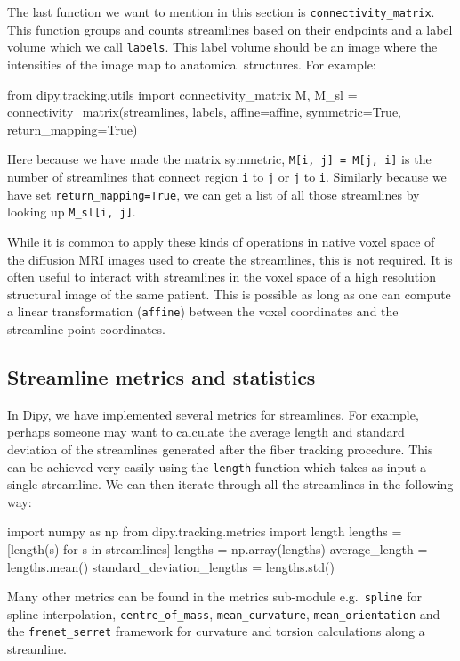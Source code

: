 \documentclass{bioinfo}
\begin{document}
The last function we want to mention in this section is
\texttt{connectivity\_matrix}. This function groups and counts streamlines
based on their endpoints and a label volume which we call \texttt{labels}. This
label volume should be an image where the intensities of the image map to
anatomical structures. For example:

\begin{python}
from dipy.tracking.utils import
                              connectivity_matrix
M, M_sl = connectivity_matrix(streamlines, labels,
                              affine=affine,
                              symmetric=True,
                              return_mapping=True)
\end{python}

Here because we have made the matrix symmetric, \texttt{M[i, j] = M[j, i]} is the number of streamlines that connect region \texttt{i} to \texttt{j}
or \texttt{j} to \texttt{i}. Similarly because we have set
\texttt{return\_mapping=True}, we can get a list of all those streamlines by
looking up \texttt{M\_sl[i, j]}.

While it is common to apply these kinds of operations in native voxel space of
the diffusion MRI images used to create the streamlines, this is not
required. It is often useful to interact with streamlines in the voxel space of
a high resolution structural image of the same patient. This is possible as
long as one can compute a linear transformation (\texttt{affine}) between the voxel coordinates and the streamline point coordinates.

\subsection{Streamline metrics and statistics}

In Dipy, we have implemented several metrics for streamlines. For example,
perhaps someone may want to calculate the
average length and standard deviation of the streamlines generated after the
fiber tracking procedure. This can be achieved very easily using the \texttt{length}
function which takes as input a single streamline. We can then iterate through
all the streamlines in the following way:
\begin{python}
import numpy as np
from dipy.tracking.metrics import length
lengths = [length(s) for s in streamlines]
lengths = np.array(lengths)
average_length = lengths.mean()
standard_deviation_lengths = lengths.std()
\end{python}
Many other metrics can be found in the metrics sub-module e.g.~\texttt{spline} for
spline interpolation, \texttt{centre\_of\_mass}, \texttt{mean\_curvature},
\texttt{mean\_orientation} and the \texttt{frenet\_serret} framework for curvature
and torsion calculations along a streamline.
\end{document}
